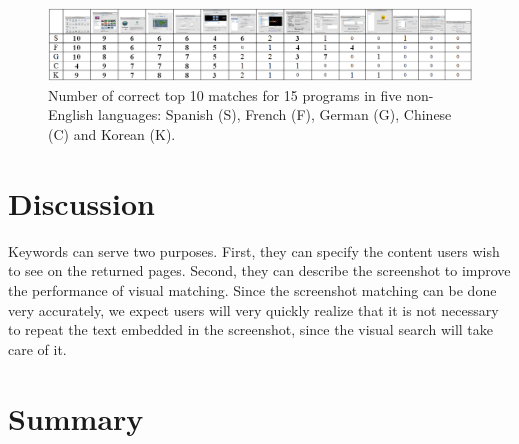 \documentclass{www2010-submission}
\begin{document}
\begin{figure}
\includegraphics[width=2\columnwidth]{figure/bilingual_search.png}
\caption{Number of correct top 10 matches for 15 programs in five non-English
languages: Spanish (S), French (F), German (G), Chinese (C) and Korean (K).}
\end{figure}


\section{Discussion}

Keywords can serve two purposes. First, they can specify the
content users wish to see on the returned pages. Second, they can
describe the screenshot to improve the performance of visual
matching. Since the screenshot matching can be done very
accurately, we expect users will very quickly realize that it is
not necessary to repeat the text embedded in the screenshot, since
the visual search will take care of it.


\section{Summary}


\balancecolumns %
\end{document}
